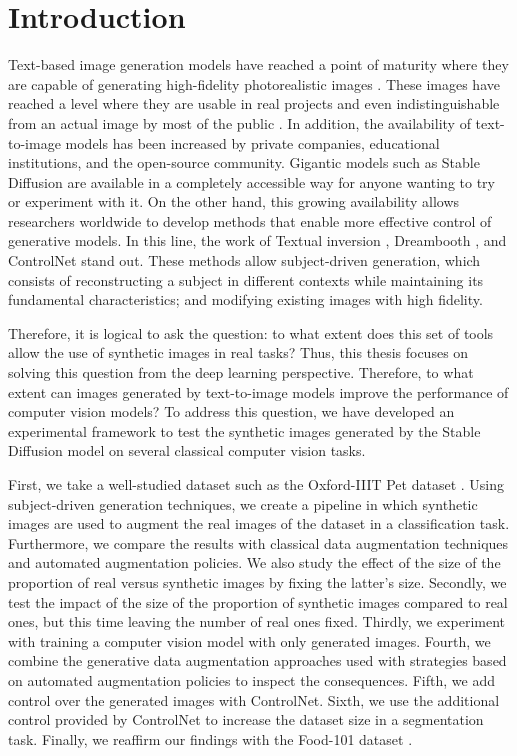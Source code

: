 \chapter{Introduction}

Text-based image generation models have reached a point of maturity where they are capable of generating high-fidelity photorealistic images \cite{ho2020denoising, dhariwal2021diffusion}. These images have reached a level where they are usable in real projects and even indistinguishable from an actual image by most of the public \cite{newyorktimesbelieve}. In addition, the availability of text-to-image models has been increased by private companies, educational institutions, and the open-source community. Gigantic models such as Stable Diffusion are available in a completely accessible way for anyone wanting to try or experiment with it. On the other hand, this growing availability allows researchers worldwide to develop methods that enable more effective control of generative models. In this line, the work of Textual inversion \cite{gal2022image}, Dreambooth \cite{ruiz2022dreambooth}, and ControlNet \cite{zhang2023adding} stand out. These methods allow subject-driven generation, which consists of reconstructing a subject in different contexts while maintaining its fundamental characteristics; and modifying existing images with high fidelity.

Therefore, it is logical to ask the question: to what extent does this set of tools allow the use of synthetic images in real tasks? Thus, this thesis focuses on solving this question from the deep learning perspective. Therefore, to what extent can images generated by text-to-image models improve the performance of computer vision models? To address this question, we have developed an experimental framework to test the synthetic images generated by the Stable Diffusion model on several classical computer vision tasks.

First, we take a well-studied dataset such as the Oxford-IIIT Pet dataset \cite{Parkhi2012CatsAD}. Using subject-driven generation techniques, we create a pipeline in which synthetic images are used to augment the real images of the dataset in a classification task. Furthermore, we compare the results with classical data augmentation techniques and automated augmentation policies. We also study the effect of the size of the proportion of real versus synthetic images by fixing the latter's size. Secondly, we test the impact of the size of the proportion of synthetic images compared to real ones, but this time leaving the number of real ones fixed. Thirdly, we experiment with training a computer vision model with only generated images. Fourth, we combine the generative data augmentation approaches used with strategies based on automated augmentation policies to inspect the consequences. Fifth, we add control over the generated images with ControlNet. Sixth, we use the additional control provided by ControlNet to increase the dataset size in a segmentation task. Finally, we reaffirm our findings with the Food-101 dataset \cite{bossard14}.

